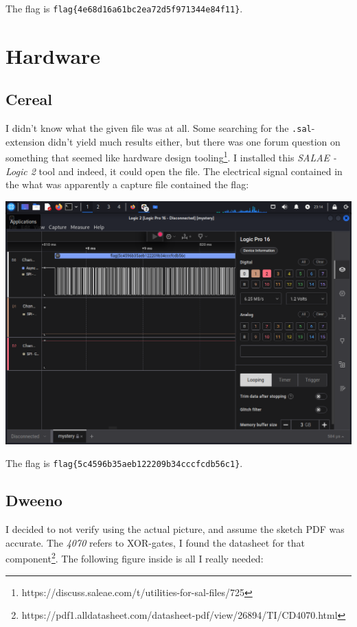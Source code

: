 \documentclass{article}
\begin{document}



\noindent
The flag is \texttt{flag\{4e68d16a61bc2ea72d5f971344e84f11\}}.

\section{Hardware}
\subsection{Cereal}

I didn't know what the given file was at all. Some searching for the \texttt{.sal}-extension didn't yield much results either, but there was one forum question on something that seemed like hardware design tooling\footnote{https://discuss.saleae.com/t/utilities-for-sal-files/725}. I installed this \textit{SALAE - Logic 2} tool and indeed, it could open the file. The electrical signal contained in the what was apparently a capture file contained the flag:

\begin{center}
    \includegraphics[width=16cm]{cereal/screenshot.png}
\end{center}

\noindent The flag is \texttt{flag\{5c4596b35aeb122209b34cccfcdb56c1\}}. 

\subsection{Dweeno}

I decided to not verify using the actual picture, and assume the sketch PDF was accurate. The \textit{4070} refers to XOR-gates, I found the datasheet for that component\footnote{https://pdf1.alldatasheet.com/datasheet-pdf/view/26894/TI/CD4070.html}. The following figure inside is all I really needed:
\end{document}
